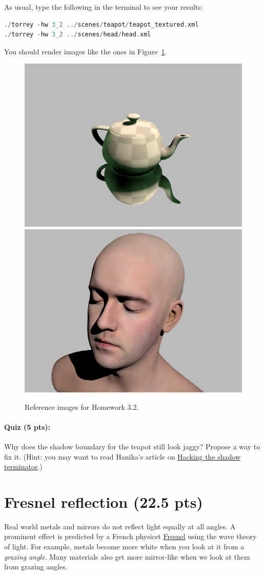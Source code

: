 As usual, type the following in the terminal to see your results:
\begin{lstlisting}[language=C++]
./torrey -hw 3_2 ../scenes/teapot/teapot_textured.xml
./torrey -hw 3_2 ../scenes/head/head.xml
\end{lstlisting}
You should render images like the ones in Figure~\ref{fig:hw_3_2}.

\begin{figure}[ht]
    \centering
    \includegraphics[width=0.3\linewidth]{imgs/hw_3_2a.png}
    \includegraphics[width=0.3\linewidth]{imgs/hw_3_2b.png}
    \caption{Reference images for Homework 3.2.}
    \label{fig:hw_3_2}
\end{figure}

\paragraph{Quiz (5 pts):} Why does the shadow boundary for the teapot still look jaggy? Propose a way to fix it. (Hint: you may want to read Hanika's article on \href{https://jo.dreggn.org/home/2021_terminator.pdf}{Hacking the shadow terminator}.)

\section{Fresnel reflection (22.5 pts)}
Real world metals and mirrors do not reflect light equally at all angles. A prominent effect is predicted by a French physicst \href{https://en.wikipedia.org/wiki/Augustin-Jean_Fresnel}{Fresnel} using the wave theory of light. For example, metals become more white when you look at it from a \emph{grazing angle}. Many materials also get more mirror-like when we look at them from grazing angles.

